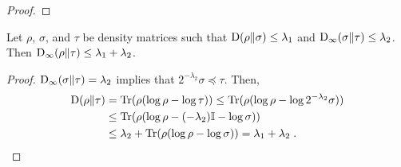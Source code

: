 \begin{proof}
\end{proof}

%

%

\begin{proposition}
\label{prop:relative_min_entropy_chain_rule2}
Let $\rho$, $\sigma$, and $\tau$ be density matrices such that $\mathrm{D}(\rho \| \sigma) \leq \lambda_1$ and $\mathrm{D}_\infty(\sigma \| \tau) \leq \lambda_2$. Then $\mathrm{D}_\infty(\rho \| \tau) \leq \lambda_1 + \lambda_2$.
\end{proposition}
\begin{proof}
	$\mathrm{D}_\infty(\sigma \| \tau) = \lambda_2$ implies that $2^{-\lambda_2} \sigma \preceq \tau$. Then,
	\begin{align*}
		\mathrm{D}(\rho \| \tau) &= \mbox{\rm Tr}(\rho (\log \rho - \log \tau)) \leq \mbox{\rm Tr}(\rho(\log \rho - \log 2^{-\lambda_2} \sigma)) \\
		&\leq \mbox{\rm Tr}(\rho(\log \rho - (-\lambda_2)\mathbb{I} - \log \sigma)) \\
		&\leq \lambda_2 + \mbox{\rm Tr}(\rho (\log \rho - \log \sigma)) = \lambda_1 + \lambda_2\;.
	\end{align*}
\end{proof}


